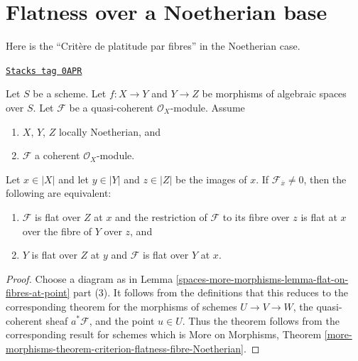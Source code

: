 \section{Flatness over a Noetherian base}
\label{spaces-more-morphisms-section-flat-over-Noetherian}
Here is the ``Crit\`ere de platitude par fibres'' in the Noetherian case.

\begin{theorem}
\label{spaces-more-morphisms-theorem-criterion-flatness-fibre-Noetherian}
\href{https://stacks.math.columbia.edu/tag/0APR}{\texttt{Stacks tag 0APR}}

Let $S$ be a scheme.
Let $f : X \to Y$ and $Y \to Z$ be morphisms of algebraic spaces over $S$.
Let $\mathcal{F}$ be a quasi-coherent $\mathcal{O}_X$-module.
Assume
\begin{enumerate}
\item $X$, $Y$, $Z$ locally Noetherian, and
\item $\mathcal{F}$ a coherent $\mathcal{O}_X$-module.
\end{enumerate}
Let $x \in |X|$ and let $y \in |Y|$ and $z \in |Z|$ be the images of
$x$. If $\mathcal{F}_{\overline{x}} \not = 0$, then the following are
equivalent:
\begin{enumerate}
\item $\mathcal{F}$ is flat over $Z$ at $x$ and
the restriction of $\mathcal{F}$ to its fibre over $z$
is flat at $x$ over the fibre of $Y$ over $z$, and
\item $Y$ is flat over $Z$ at $y$ and $\mathcal{F}$ is
flat over $Y$ at $x$.
\end{enumerate}
\end{theorem}

\begin{proof}
Choose a diagram as in
Lemma \ref{spaces-more-morphisms-lemma-flat-on-fibres-at-point} part (3).
It follows from the definitions that this reduces to the
corresponding theorem for the morphisms of schemes
$U \to V \to W$, the quasi-coherent sheaf $a^*\mathcal{F}$,
and the point $u \in U$. Thus the theorem follows from the
corresponding result for schemes which is
More on Morphisms,
Theorem \ref{more-morphisms-theorem-criterion-flatness-fibre-Noetherian}.
\end{proof}

